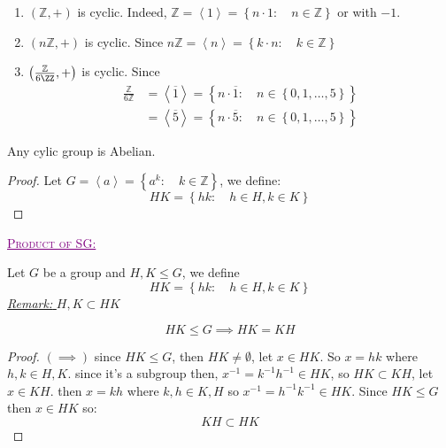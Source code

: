 \begin{example}
\begin{enumerate}
\item $(\mathbb{Z}, +)  $ is cyclic. Indeed, $\mathbb{Z} = \left\langle 1 \right\rangle  = 
  \left\{ n \cdot 1: \quad n \in \mathbb{Z} \right\}$ or with $-1$. 
  \item $\left( n \mathbb{Z}, + \right) $  is cyclic. Since $n \mathbb{Z} =\left\langle n \right\rangle  = 
    \left\{ k \cdot n: \quad k \in \mathbb{Z} \right\}$ 
    \item $\left( 
        \frac{\mathbb{Z}}{6 \ZZ}, +
      \right) $ is cyclic. Since 
      \begin{align*}
      \frac{\mathbb{Z}}{6 \mathbb{Z}} &= 
      \left\langle 
        \overline{1}
      \right\rangle = 
      \left\{ n \cdot  \overline{1}: \quad n \in \left\{ 0, 1, \hdots , 5 \right\} \right\} \\
                                      &= 
                    \left\langle \overline{5} \right\rangle  = 
                    \left\{ n \cdot \overline{5}: \quad n \in  \left\{ 0, 1, \hdots , 5 \right\} \right\}
      \end{align*}
\end{enumerate}
\end{example}
\begin{proposition}[]
Any cylic group is Abelian.
\end{proposition}
\begin{proof}
Let $G = \left\langle a \right\rangle = \left\{ a ^{k}: \quad k \in \mathbb{Z} \right\} $, we 
define: 
\[
HK = \left\{ hk: \quad h \in  H, k \in  K \right\}
\]
\end{proof}
\divider
\begin{center}
 \textcolor{purple}{\underline{\textsc{Product of SG:}}} 
\end{center}
Let $G $ be a group and $H, K \leq G $, we define 
\[
HK = 
\left\{ hk: \quad h \in H, k \in K \right\}
\]
\underline{\emph{Remark: }} $H, K \subset HK $ 
\begin{proposition}[]
\[
HK \leq G \implies 
HK = KH
\]
\end{proposition}
\begin{proof}
$( \implies )$ since $HK \leq G $, then $HK \neq  \emptyset $,
let $x \in HK $. So $x = hk$ where $h, k \in H, K$. since it's a subgroup then, $x^{-1} = k^{-1} h^{-1} \in HK$, 
so $HK \subset KH $, let $x \in  KH $. then $x = kh $ where $k, h \in  K, H $ so $x^{-1} = h^{-1} k^{-1} \in  HK $. Since
$HK \leq G $ then $x \in  HK  $ so: 
\[
KH \subset HK
\]
\end{proof}
